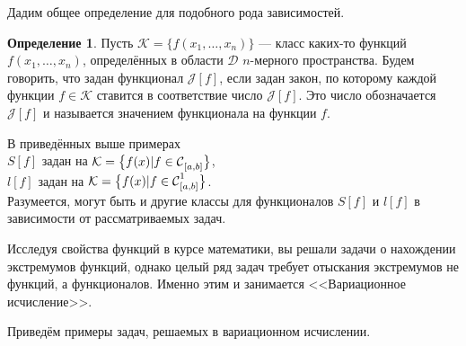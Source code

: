 \documentclass[12pt,a4paper,openany,fleqn]{book}
\newcommand{\Cf}{\ensuremath{\mathcal{C}}}
\newcommand{\J}{\ensuremath{\mathcal{J}}}
\newcommand{\mc}[1]{\ensuremath{\mathcal{#1}}}
\newcommand{\Cfn}[2][]{\ensuremath{\Cf{\mathstrut}^{#2}_{#1}}}
\theoremstyle{definition}
\newtheorem{_def}{Определение}[section]
\begin{document}
	\noindent Дадим общее определение для подобного рода зависимостей.
	\begin{_def}
		Пусть $\mc{K}=\{f(x_1,\ldots,x_n)\}$ --- класс каких-то функций $f(x_1,\ldots,x_n)$, определённых в области $\mc{D}$ $n$-мерного пространства. Будем говорить, что задан функционал $\J[f]$, если задан закон, по которому каждой функции $f\in\mc{K}$ ставится в соответствие число $\J[f]$. Это число обозначается $\J[f]$ и называется значением функционала на функции $f$.
	\end{_def}
	
	\noindent В приведённых выше примерах \\
	\indent$S[f]$ задан на $\mc{K}=\big\{f(x)|f\in \Cfn[{[a,b]}]{}\big\}$,\\
	\indent $l[f]$ задан на $\mc{K}=\big\{f(x)|f\in \Cfn[{[a,b]}]{1}\big\}$.\\
	Разумеется, могут быть и другие классы для функционалов $S[f]$ и $l[f]$ в зависимости от рассматриваемых задач.
	
	Исследуя свойства функций в курсе математики, вы решали задачи о нахождении экстремумов функций, однако целый ряд задач требует отыскания экстремумов не функций, а функционалов. Именно этим и занимается <<Вариационное исчисление>>.
	\vspace{0.25cm}
	
	Приведём примеры задач, решаемых в вариационном исчислении.
	
\end{document}
